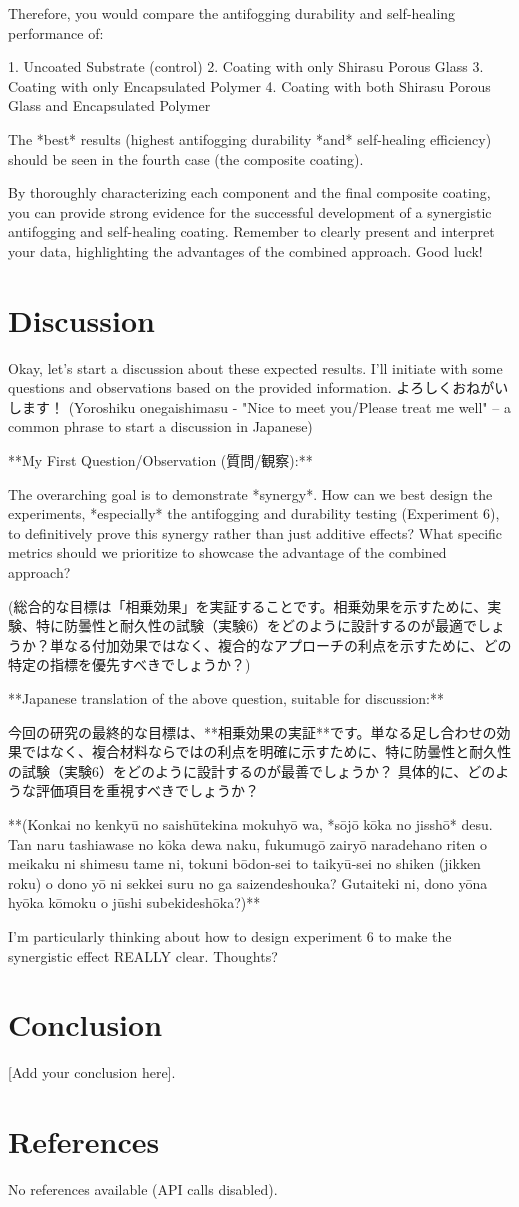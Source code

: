 \documentclass{article}
\begin{document}
Therefore, you would compare the antifogging durability and self-healing performance of:

1.  Uncoated Substrate (control)
2.  Coating with only Shirasu Porous Glass
3.  Coating with only Encapsulated Polymer
4.  Coating with both Shirasu Porous Glass and Encapsulated Polymer

The *best* results (highest antifogging durability *and* self-healing efficiency) should be seen in the fourth case (the composite coating).

By thoroughly characterizing each component and the final composite coating, you can provide strong evidence for the successful development of a synergistic antifogging and self-healing coating. Remember to clearly present and interpret your data, highlighting the advantages of the combined approach. Good luck!


\section{Discussion}
Okay, let's start a discussion about these expected results. I'll initiate with some questions and observations based on the provided information.  よろしくおねがいします！ (Yoroshiku onegaishimasu - "Nice to meet you/Please treat me well" – a common phrase to start a discussion in Japanese)

**My First Question/Observation (質問/観察):**

The overarching goal is to demonstrate *synergy*. How can we best design the experiments, *especially* the antifogging and durability testing (Experiment 6), to definitively prove this synergy rather than just additive effects?  What specific metrics should we prioritize to showcase the advantage of the combined approach?

(総合的な目標は「相乗効果」を実証することです。相乗効果を示すために、実験、特に防曇性と耐久性の試験（実験6）をどのように設計するのが最適でしょうか？単なる付加効果ではなく、複合的なアプローチの利点を示すために、どの特定の指標を優先すべきでしょうか？)

**Japanese translation of the above question, suitable for discussion:**

今回の研究の最終的な目標は、**相乗効果の実証**です。単なる足し合わせの効果ではなく、複合材料ならではの利点を明確に示すために、特に防曇性と耐久性の試験（実験6）をどのように設計するのが最善でしょうか？ 具体的に、どのような評価項目を重視すべきでしょうか？

**(Konkai no kenkyū no saishūtekina mokuhyō wa, *sōjō kōka no jisshō* desu. Tan naru tashiawase no kōka dewa naku, fukumugō zairyō naradehano riten o meikaku ni shimesu tame ni, tokuni bōdon-sei to taikyū-sei no shiken (jikken roku) o dono yō ni sekkei suru no ga saizendeshouka?  Gutaiteki ni, dono yōna hyōka kōmoku o jūshi subekideshōka?)**

I'm particularly thinking about how to design experiment 6 to make the synergistic effect REALLY clear. Thoughts?


\section{Conclusion}
[Add your conclusion here].

\section{References}
No references available (API calls disabled).
\end{document}

